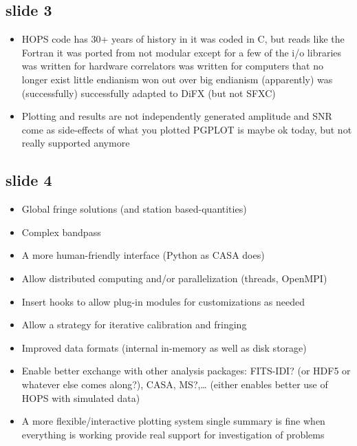 \subsection{slide 3}
\begin{itemize}
\item \ac{HOPS} code has 30+ years of history in it
\sbitem was coded in \ac{C}, but reads like the \ac{Fortran} it was ported from
\sbitem not modular except for a few of the i/o libraries
\sbitem was written for hardware correlators
\sbitem was written for computers that no longer exist
\sbitem little endianism won out over big endianism (apparently)
\sbitem was (successfully) successfully adapted to \ac{DiFX}
(but not \eg \ac{SFXC})
\item Plotting and results are not independently generated
\sbitem amplitude and \ac{SNR} come as side-effects of what you plotted
\sbitem \ac{PGPLOT} is maybe ok today, but not really supported anymore
\end{itemize}

\subsection{slide 4}
\begin{itemize}
\item Global fringe solutions (and station based-quantities)
\item Complex bandpass
\item A more human-friendly interface (\eg \ac{Python} as \ac{CASA} does)
\item Allow distributed computing and/or parallelization (threads, OpenMPI)
\item Insert hooks to allow plug-in modules for customizations as needed
\item Allow a strategy for iterative calibration and fringing
\item Improved data formats (internal in-memory as well as disk storage)
\item Enable better exchange with other analysis packages:
\sbitem \ac{FITS-IDI}? (or \ac{HDF5} or whatever else comes along?),
\ac{CASA},
\ac{MS}?,\ldots
\sbitem (either enables better use of \ac{HOPS} with simulated data)
\item A more flexible/interactive plotting system
\sbitem single summary is fine when everything is working
\sbitem provide real support for investigation of problems
\end{itemize}

